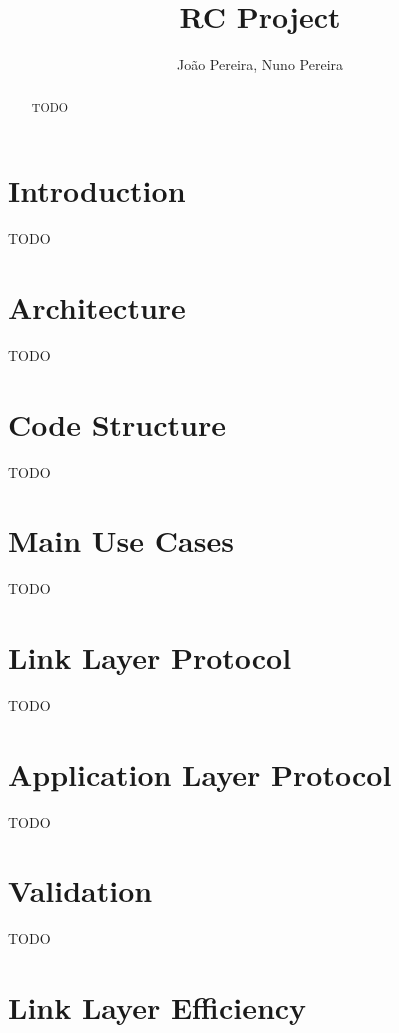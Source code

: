 \documentclass[11pt,a4paper]{article}
\title{RC Project}
\author{João Pereira, Nuno Pereira}
\begin{document}
    
\maketitle

\begin{abstract}
    TODO
\end{abstract}

\pagebreak

\tableofcontents

\pagebreak

\section{Introduction}

TODO

\section{Architecture}

TODO

\section{Code Structure}

TODO

\section{Main Use Cases}

TODO

\section{Link Layer Protocol}

TODO

\section{Application Layer Protocol}

TODO

\section{Validation}

TODO

\section{Link Layer Efficiency}
\end{document}
